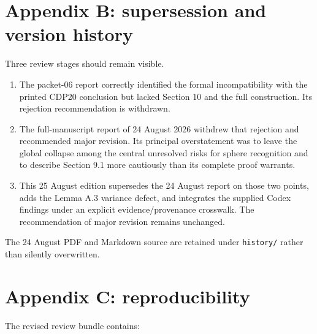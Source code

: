 \documentclass[
  10pt,
  letterpaper,
]{article}
\providecommand{\tightlist}{%
  \setlength{\itemsep}{0pt}\setlength{\parskip}{0pt}}
\begin{document}
\section{Appendix B: supersession and version
history}\label{appendix-b-supersession-and-version-history}

Three review stages should remain visible.

\begin{enumerate}
\def\labelenumi{\arabic{enumi}.}
\tightlist
\item
  The packet-06 report correctly identified the formal incompatibility
  with the printed CDP20 conclusion but lacked Section 10 and the full
  construction. Its rejection recommendation is withdrawn.
\item
  The full-manuscript report of 24 August 2026 withdrew that rejection
  and recommended major revision. Its principal overstatement was to
  leave the global collapse among the central unresolved risks for
  sphere recognition and to describe Section 9.1 more cautiously than
  its complete proof warrants.
\item
  This 25 August edition supersedes the 24 August report on those two
  points, adds the Lemma A.3 variance defect, and integrates the
  supplied Codex findings under an explicit evidence/provenance
  crosswalk. The recommendation of major revision remains unchanged.
\end{enumerate}

The 24 August PDF and Markdown source are retained under
\texttt{history/} rather than silently overwritten.

\section{Appendix C: reproducibility}\label{appendix-c-reproducibility}

The revised review bundle contains:
\end{document}
